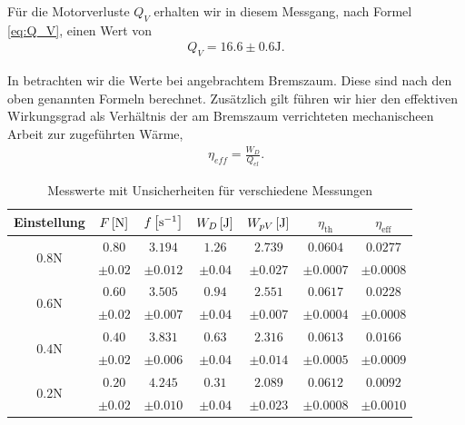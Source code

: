 Für die Motorverluste $Q_V$ erhalten wir in diesem Messgang, nach Formel \eqref{eq:Q_V}, einen Wert von
\begin{align}
    Q_V = 16.6 \pm 0.6 \si{\joule}.
\end{align}

In  betrachten wir die Werte bei angebrachtem Bremszaum. Diese sind nach den oben genannten Formeln berechnet. Zusätzlich gilt führen wir hier den effektiven Wirkungsgrad als Verhältnis der am Bremszaum verrichteten mechanischeen Arbeit zur zugeführten Wärme,
\begin{align}
    \eta_{eff} = \frac{W_D}{Q_{el}}.
\end{align}

\begin{table}[H]
    \centering
    \begin{tabular}{c c c c c c c}
    \toprule
    \textbf{Einstellung} & \boldmath$F\,\qty[\si{\newton}]$ & \boldmath$f\,\qty[\si{\per\second}]$ & \boldmath$W_D\,\qty[\si{\joule}]$ & \boldmath$W_{pV}\,\qty[\si{\joule}]$ & \boldmath$\eta_{\text{th}}$ & \boldmath$\eta_{\text{eff}}$ \\
    \midrule
    \multirow{2}{*}{\boldmath$0.8\si{\newton}$} & $0.80$ & $3.194$ & $1.26$ & $2.739$ & $0.0604$ & $0.0277$ \\
     & $\pm 0.02$ & $\pm 0.012$ & $\pm 0.04$ & $\pm 0.027$ & $\pm 0.0007$ & $\pm 0.0008$ \\
    \midrule
    \multirow{2}{*}{\boldmath$0.6\si{\newton}$} & $0.60$ & $3.505$ & $0.94$ & $2.551$ & $0.0617$ & $0.0228$ \\
     & $\pm 0.02$ & $\pm 0.007$ & $\pm 0.04$ & $\pm 0.007$ & $\pm 0.0004$ & $\pm 0.0008$ \\
    \midrule
    \multirow{2}{*}{\boldmath$0.4\si{\newton}$} & $0.40$ & $3.831$ & $0.63$ & $2.316$ & $0.0613$ & $0.0166$ \\
     & $\pm 0.02$ & $\pm 0.006$ & $\pm 0.04$ & $\pm 0.014$ & $\pm 0.0005$ & $\pm 0.0009$ \\
    \midrule
    \multirow{2}{*}{\boldmath$0.2\si{\newton}$} & $0.20$ & $4.245$ & $0.31$ & $2.089$ & $0.0612$ & $0.0092$ \\
     & $\pm 0.02$ & $\pm 0.010$ & $\pm 0.04$ & $\pm 0.023$ & $\pm 0.0008$ & $\pm 0.0010$ \\
    \bottomrule
    \end{tabular}
    \label{tab:werte_gebremst}
    \caption{Messwerte mit Unsicherheiten für verschiedene Messungen}
\end{table}

